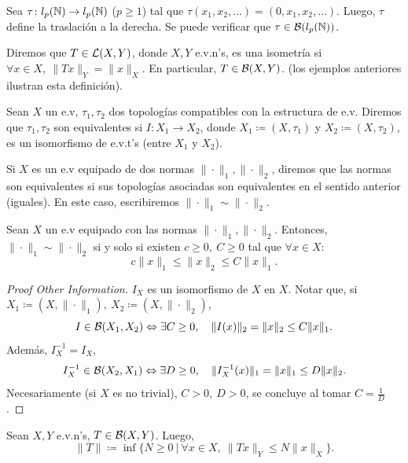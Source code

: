 \begin{eg}
	Sea $\tau \colon l_{p}(\mathbb{N}) \to l_{p}(\mathbb{N})$ ($p \geq 1$) tal que $\tau(x_{1},x_{2},\dots) = (0,x_{1},x_{2},\dots)$. Luego, $\tau$ define la traslación a la derecha. Se puede verificar que $\tau \in \mathcal{B}(l_{p}(\mathbb{N}))$.
\end{eg}

\begin{eg}
	Diremos que $T \in \mathcal{L}(X,Y)$, donde $X,Y$ e.v.n's, es una isometría si $\forall x \in X,\ \| Tx \|_{Y} = \| x \|_{X}$. En particular, $T \in \mathcal{B}(X,Y)$. (los ejemplos anteriores ilustran esta definición).
\end{eg}

\begin{definition}
	Sean $X$ un e.v, $\tau_{1},\tau_{2}$ dos topologías compatibles con la estructura de e.v. Diremos que $\tau_{1},\tau_{2}$ son equivalentes si $I \colon X_{1} \to X_{2}$, donde $X_{1} \coloneq (X, \tau_{1})$ y $X_{2} \coloneq (X, \tau_{2})$, es un isomorfismo de e.v.t's (entre $X_{1}$ y $X_{2}$). \par
	Si $X$ es un e.v equipado de dos normas $\| \cdot \|_{1}, \| \cdot \|_{2}$, diremos que las normas son equivalentes si sus topologías asociadas son equivalentes en el sentido anterior (iguales). En este caso, escribiremos $\| \cdot \|_{1} \sim \| \cdot \|_{2}$.
\end{definition}

\begin{prop}
	Sean $X$ un e.v equipado con las normas $\| \cdot \|_{1}, \| \cdot \|_{2}$. Entonces, $\| \cdot \|_{1} \sim \| \cdot \|_{2}$ si y solo si existen $c \geq 0,\ C \geq 0$ tal que $\forall x \in X$:
	\[ c \| x \|_{1} \leq \| x \|_{2} \leq C \| x \|_{1}. \]
\end{prop}
\begin{proof}[Proof Other Information]
	$I_{X}$ es un isomorfismo de $X$ en $X$. Notar que, si $X_{1} \coloneq (X, \| \cdot \|_{1}),\ X_{2} \coloneq (X, \| \cdot \|_{2})$,
	\[ I \in \mathcal{B}(X_{1},X_{2}) \Leftrightarrow \exists C \geq 0, \quad \| I(x) \|_{2} = \| x \|_{2} \leq C \| x \|_{1}. \]
	Además, $I_{X}^{-1} = I_{X}$,
	\[ I_{X}^{-1} \in \mathcal{B}(X_{2}, X_{1}) \Leftrightarrow \exists D \geq 0, \quad \| I_{X}^{-1}(x) \|_{1} = \| x \|_{1} \leq D \| x \|_{2}. \]
	Necesariamente (si $X$ es no trivial), $C > 0,\ D > 0$, se concluye al tomar $C = \frac{1}{D}$.
\end{proof}

\begin{definition}
	Sean $X,Y$ e.v.n's, $T \in \mathcal{B}(X,Y)$. Luego,
	\[ \| T \| \coloneq \inf \{N \geq 0 \ | \ \forall x \in X,\ \| Tx \|_{Y} \leq N \| x \|_{X}\}. \] 
\end{definition}

